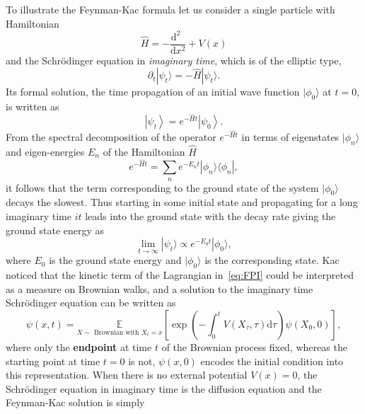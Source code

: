 To illustrate the Feynman-Kac formula let us consider a single particle with Hamiltonian
\begin{equation}
	\hat{H} = -\frac{\mathrm{d}^2~~}{\mathrm{d}x^2} + V(x)
\end{equation}
and the Schr\" odinger equation in \textit{imaginary time}, which is of the elliptic type, 
\begin{equation}
	\label{eq:imag_sch}
	\partial_t | \psi_t \rangle = - \hat{H} | \psi_t \rangle.
\end{equation}
Its formal solution, the time propagation of an initial wave function $|\phi_0\rangle$ at $t=0$, is written as
\begin{equation}
	\left| \psi_{t} \right\rangle = e^{-\hat{H} t}\left|\psi_{0}\right\rangle. 
\end{equation}
From the spectral decomposition of the operator $e^{-\hat{H} t}$ in terms of eigenstates $|\phi_n\rangle$ and eigen-energies $E_n$ of the Hamiltonian $\hat{H}$
\begin{equation}
	e^{-\hat{H} t}=\sum_{n} e^{-E_{n} t}|\phi_n\rangle\langle\phi_n|, 
\end{equation}
it follows that the term corresponding to the ground state of the system $|\phi_0\rangle$ decays the slowest. Thus starting in some initial state and propagating for a long imaginary time $it$ leads into the ground state with the decay rate giving the ground state energy as
\begin{equation}
	\lim_{t \rightarrow \infty} | \psi_t \rangle \propto e^{-E_0 t} | \phi_0 \rangle,
\end{equation} 
where $E_0$ is the ground state energy and $|\phi_0\rangle$ is the corresponding state. Kac noticed that the kinetic term of the Lagrangian in~\eqref{eq:FPI} could be interpreted as a measure on Brownian walks, and a solution to the imaginary time Schr\" odinger equation can be written as
\begin{equation}
	\psi(x, t)=\underset{X \sim \text { Brownian with } X_{t}=x}{\mathbb{E}}
	\left[\exp \left(-\int_{0}^{t}  V\left(X_{\tau}, \tau \right) \mathrm{d}\tau \right) \psi\left(X_{0}, 0\right)\right],
\end{equation}
where only the \textbf{endpoint} at time $t$ of the Brownian process fixed, whereas the starting point at time $t=0$ is not, $\psi (x, 0)$ encodes the initial condition into this representation. When there is no external potential $V(x) = 0$, the Schr\" odinger equation in imaginary time is the diffusion equation and the Feynman-Kac solution is simply
